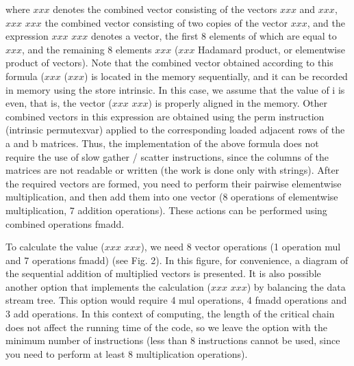 \documentclass[
11pt,%
tightenlines,%
twoside,%
onecolumn,%
nofloats,%
nobibnotes,%
nofootinbib,%
superscriptaddress,%
noshowpacs,%
centertags]%
{revtex4}
\begin{document}
where $xxx$ denotes the combined vector consisting of the vectors $xxx$ and $xxx$, $xxx$ $xxx$ the combined vector consisting of two copies of the vector $xxx$, and the expression $xxx$ $xxx$ denotes a vector, the first 8 elements of which are equal to $xxx$, and the remaining 8 elements $xxx$ ($xxx$ Hadamard product, or elementwise product of vectors). Note that the combined vector obtained according to this formula ($xxx$ ($xxx$) is located in the memory sequentially, and it can be recorded in memory using the store intrinsic. In this case, we assume that the value of i is even, that is, the vector ($xxx$ $xxx$) is properly aligned in the memory. Other combined vectors in this expression are obtained using the perm instruction (intrinsic permutexvar) applied to the corresponding loaded adjacent rows of the a and b matrices. Thus, the implementation of the above formula does not require the use of slow gather / scatter instructions, since the columns of the matrices are not readable or written (the work is done only with strings). After the required vectors are formed, you need to perform their pairwise elementwise multiplication, and then add them into one vector (8 operations of elementwise multiplication, 7 addition operations). These actions can be performed using combined operations fmadd.

To calculate the value ($xxx$ $xxx$), we need 8 vector operations (1 operation mul and 7 operations fmadd) (see Fig. 2). In this figure, for convenience, a diagram of the sequential addition of multiplied vectors is presented. It is also possible another option that implements the calculation ($xxx$ $xxx$) by balancing the data stream tree. This option would require 4 mul operations, 4 fmadd operations and 3 add operations. In this context of computing, the length of the critical chain does not affect the running time of the code, so we leave the option with the minimum number of instructions (less than 8 instructions cannot be used, since you need to perform at least 8 multiplication operations).
\end{document}
